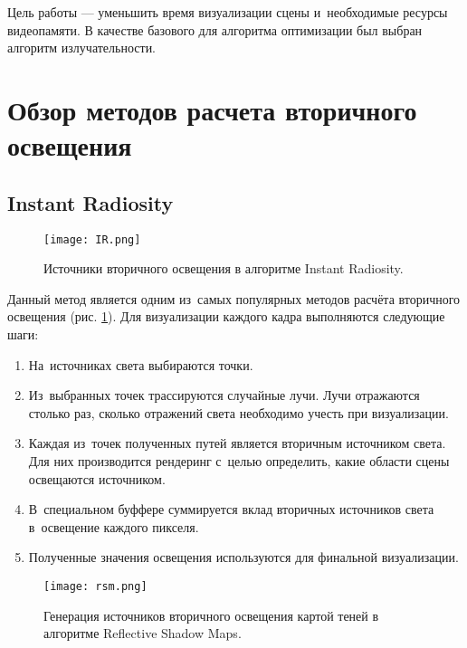 \documentclass[12pt,fleqn]{article}
\begin{document}
Цель работы --- уменьшить время визуализации сцены и~необходимые ресурсы видеопамяти. В качестве базового для алгоритма оптимизации был выбран алгоритм излучательности.

\pagebreak

\section{Обзор методов расчета вторичного освещения}

\subsection{Instant Radiosity}

\begin{figure}[htb]
    \centering
    \texttt{[image: IR.png]}
    \caption{Источники вторичного освещения в алгоритме Instant Radiosity.}
    \label{IR}
\end{figure}

Данный метод \cite{InstantRadiosity} является одним из~самых популярных методов расчёта вторичного освещения (рис. \ref{IR}). Для визуализации каждого кадра выполняются следующие шаги:

\begin{enumerate}

\item На~источниках света выбираются точки.

\item Из~выбранных точек трассируются случайные лучи. Лучи отражаются столько раз, сколько отражений света необходимо учесть при визуализации.

\item Каждая из~точек полученных путей является вторичным источником света. Для них производится рендеринг с~целью определить, какие области сцены освещаются источником.

\item В~специальном буффере суммируется вклад вторичных источников света в~освещение каждого пикселя.

\item Полученные значения освещения используются для финальной визуализации.

\end{enumerate}

\begin{figure}[htb]
    \centering
    \texttt{[image: rsm.png]}
    \caption{Генерация источников вторичного освещения картой теней в алгоритме Reflective Shadow Maps.}
    \label{rsm}
\end{figure}
\end{document}
